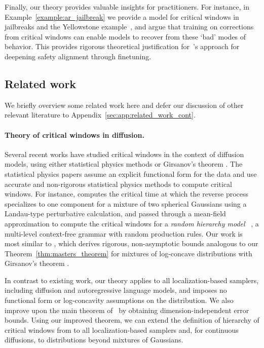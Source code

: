 Finally, our theory provides valuable insights for practitioners. For instance, in Example~\ref{example:ar_jailbreak} we provide a model for critical windows in jailbreaks and the Yellowstone example~\citep{anthropicyellowstone,qi2024safetyalignmentjusttokens}, and argue that training on corrections from critical windows can enable models to recover from these `bad' modes of behavior. This provides rigorous theoretical justification for~\cite{qi2024safetyalignmentjusttokens}'s approach for deepening safety alignment through finetuning. 

\subsection{Related work}\label{sec:related}
We briefly overview some related work here and defer our discussion of other relevant literature to Appendix~\ref{sec:app:related_work_cont}. 

\paragraph{Theory of critical windows in diffusion.} Several recent works have studied critical windows in the context of diffusion models, using either statistical physics methods \citep{raya2023spontaneous,sclocchi2024probinglatenthierarchicalstructure,sclocchi2024phasetransitiondiffusionmodels,biroli2024dynamical} or Girsanov's theorem \citep{li2024criticalwindowsnonasymptotictheory}. The statistical physics papers assume an explicit functional form for the data and use accurate and non-rigorous statistical physics methods to compute critical windows. For instance, \cite{biroli2024dynamical} computes the critical time at which the reverse process specializes to one component for a mixture of two spherical Gaussians using a Landau-type perturbative calculation, and \cite{sclocchi2024phasetransitiondiffusionmodels,sclocchi2024probinglatenthierarchicalstructure} passed through a mean-field approximation to compute the critical windows for a \emph{random hierarchy model} ~\citep{petrini2023deep}, a multi-level context-free grammar with random production rules. Our work is most similar to \citep{li2024criticalwindowsnonasymptotictheory}, which derives rigorous, non-asymptotic bounds analogous to our Theorem~\ref{thm:masters_theorem} for mixtures of log-concave distributions with Girsanov's theorem \citep{DBLP:conf/iclr/ChenC0LSZ23}.

In contrast to existing work, our theory applies to all localization-based samplers, including diffusion and autoregressive language models, and imposes no functional form or log-concavity assumptions on the distribution. We also improve upon the main theorem of~\citep{li2024criticalwindowsnonasymptotictheory} by obtaining dimension-independent error bounds. Using our improved theorem, we can extend the definition of hierarchy of critical windows from \cite{li2024criticalwindowsnonasymptotictheory} to all localization-based samplers and, for continuous diffusions, to distributions beyond mixtures of Gaussians. 
